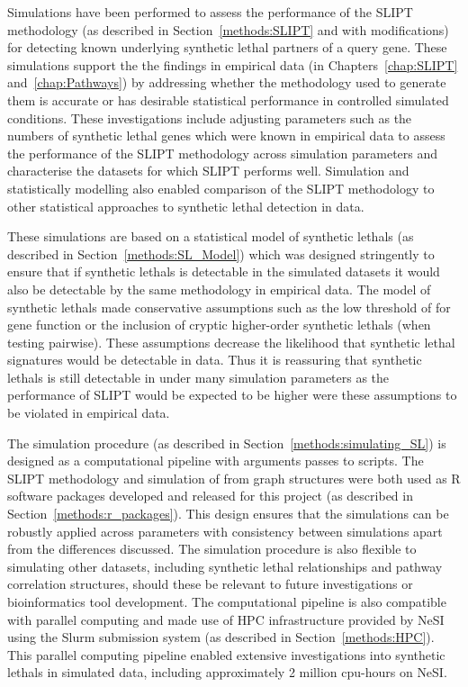 Simulations have been performed to assess the performance of the \gls{SLIPT} methodology (as described in Section~\ref{methods:SLIPT} and with modifications) for detecting known underlying \gls{synthetic lethal} partners of a query gene. These simulations support the the findings in empirical data (in Chapters~\ref{chap:SLIPT} and~\ref{chap:Pathways}) by addressing whether the methodology used to generate them is accurate or has desirable statistical performance in controlled simulated conditions. These investigations include adjusting parameters such as the numbers of \gls{synthetic lethal} genes which were known in empirical data to assess the performance of the \gls{SLIPT} methodology across simulation parameters and characterise the datasets for which \gls{SLIPT} performs well. Simulation and statistically modelling also enabled comparison of the \gls{SLIPT} methodology to other statistical approaches to \gls{synthetic lethal} detection in  data.

These simulations are based on a statistical model of \glspl{synthetic lethal} (as described in Section~\ref{methods:SL_Model}) which was designed stringently to ensure that if \glspl{synthetic lethal} is detectable in the simulated datasets it would also be detectable by the same methodology in empirical  data. The model of \glspl{synthetic lethal} made conservative assumptions such as the low threshold of  for gene function or the inclusion of cryptic higher-order \glspl{synthetic lethal} (when testing pairwise). These assumptions decrease the likelihood that \gls{synthetic lethal} signatures would be detectable in  data. Thus it is reassuring that \glspl{synthetic lethal} is still detectable in under many simulation parameters as the performance of \gls{SLIPT} would be expected to be higher were these assumptions to be violated in empirical data.


The simulation procedure (as described in Section~\ref{methods:simulating_SL}) is designed as a computational pipeline with arguments passes to scripts. The \gls{SLIPT} methodology and simulation of  from \gls{graph} structures were both used as R \citep{R_core} software packages developed and released for this project (as described in Section~\ref{methods:r_packages}). This design ensures that the simulations can be robustly applied across parameters with consistency between simulations apart from the differences discussed. The simulation procedure is also flexible to simulating other datasets, including \gls{synthetic lethal} relationships and pathway correlation structures, should these be relevant to future investigations or \gls{bioinformatics} tool development. The computational pipeline is also compatible with parallel computing and made use of \gls{HPC} infrastructure provided by \gls{NeSI} using the \gls{Slurm} submission system (as described in Section~\ref{methods:HPC}). This parallel computing pipeline enabled extensive investigations into \glspl{synthetic lethal} in simulated data, including approximately 2 million cpu-hours on \gls{NeSI}. 


